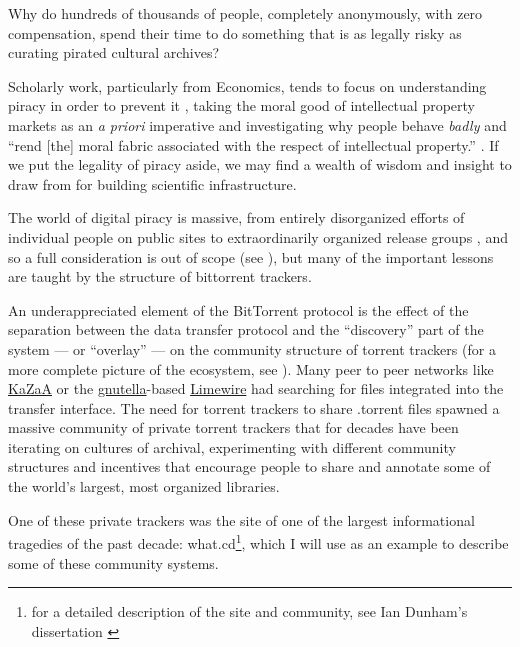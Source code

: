 Why do hundreds of thousands of people, completely anonymously, with
zero compensation, spend their time to do something that is as legally
risky as curating pirated cultural archives?

Scholarly work, particularly from Economics, tends to focus on
understanding piracy in order to prevent it\citep{basamanowiczReleaseGroupsDigital2011, hindujaDeindividuationInternetSoftware2008} , taking the moral good
of intellectual property markets as an \emph{a priori} imperative and
investigating why people behave \emph{badly} and ``rend {[}the{]} moral
fabric associated with the respect of intellectual property.'' \citep{hindujaDeindividuationInternetSoftware2008} . If we put the legality
of piracy aside, we may find a wealth of wisdom and insight to draw from
for building scientific infrastructure.

The world of digital piracy is massive, from entirely disorganized
efforts of individual people on public sites to extraordinarily
organized release groups \citep{basamanowiczReleaseGroupsDigital2011} , and so a full consideration is out of scope (see \citep{eveWarezInfrastructureAesthetics2021} ), but many of the important
lessons are taught by the structure of bittorrent trackers.

An underappreciated element of the BitTorrent protocol is the effect of
the separation between the data transfer protocol and the ``discovery''
part of the system --- or ``overlay'' --- on the community structure of
torrent trackers (for a more complete picture of the ecosystem, see \citep{zhangUnravelingBitTorrentEcosystem2011} ). Many peer to peer
networks like \href{https://en.wikipedia.org/wiki/Kazaa}{KaZaA} or the
\href{https://en.wikipedia.org/wiki/Gnutella}{gnutella}-based
\href{https://en.wikipedia.org/wiki/LimeWire}{Limewire} had searching
for files integrated into the transfer interface. The need for torrent
trackers to share .torrent files spawned a massive community of private
torrent trackers that for decades have been iterating on cultures of
archival, experimenting with different community structures and
incentives that encourage people to share and annotate some of the
world's largest, most organized libraries.

One of these private trackers was the site of one of the largest
informational tragedies of the past decade: what.cd\footnote{for a
  detailed description of the site and community, see Ian Dunham's
  dissertation \citep{dunhamWhatCDLegacy2018} }, which I will use
as an example to describe some of these community systems.

